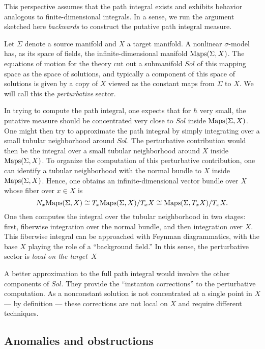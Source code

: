 \begin{rmk}
This perspective assumes that the path integral exists and exhibits behavior analogous to finite-dimensional integrals.
In a sense, we run the argument sketched here {\it backwards} to construct the putative path integral measure.
\end{rmk}

Let $\Sigma$ denote a source manifold and $X$ a target manifold.
A nonlinear $\sigma$-model has, as its space of fields, the infinite-dimensional manifold ${\rm Maps}(\Sigma,X)$.
The equations of motion for the theory cut out a submanifold $Sol$ of this mapping space as the space of solutions,
and typically a component of this space of solutions is given by a copy of $X$ viewed as the constant maps from $\Sigma$ to $X$.
We will call this the {\em perturbative} sector.

In trying to compute the path integral, one expects that for $\hbar$ very small, 
the putative measure should be concentrated very close to $Sol$ inside ${\rm Maps}(\Sigma,X)$.
One might then try to approximate the path integral by simply integrating over a small tubular neighborhood around $Sol$.
The perturbative contribution would then be the integral over a small tubular neighborhood around $X$ inside ${\rm Maps}(\Sigma,X)$.
To organize the computation of this perturbative contribution, one can identify a tubular neighborhood with the normal bundle to $X$ inside ${\rm Maps}(\Sigma,X)$.
Hence, one obtains an infinite-dimensional vector bundle over $X$ whose fiber over $x \in X$ is 
\[
N_x {\rm Maps}(\Sigma,X) \cong T_x {\rm Maps}(\Sigma,X)/T_x X \cong {\rm Maps}(\Sigma, T_x X)/T_x X.
\]
One then computes the integral over the tubular neighborhood in two stages: 
first, fiberwise integration over the normal bundle, and then integration over $X$.
This fiberwise integral can be approached with Feynman diagrammatics,
with the base $X$ playing the role of a ``background field.''
In this sense, the perturbative sector is {\em local on the target~$X$}

A better approximation to the full path integral would involve the other components of $Sol$. 
They provide the ``instanton corrections'' to the perturbative computation.
As a nonconstant solution is not concentrated at a single point in $X$ --- by definition --- 
these corrections are not local on $X$ and require different techniques.

\subsection{Anomalies and obstructions}

